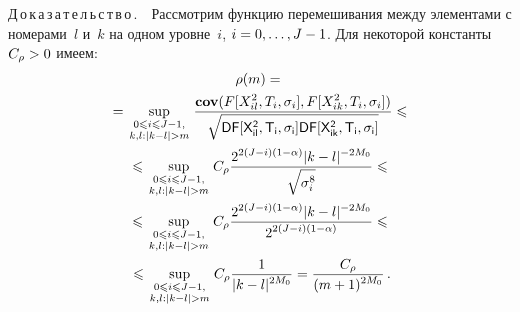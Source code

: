 \begin{multicols}{2}
\noindent
Д\,о\,к\,а\,з\,а\,т\,е\,л\,ь\,с\,т\,в\,о\,.\ \ 
Рассмотрим функцию перемешивания между элементами с номерами~$l$ и~$k$ на одном уровне~$i$, 
$i \hm=0, \dots, J-1$. Для некоторой константы $C_\rho\hm>0$ имеем:
\begin{multline}
\rho(m)={}\\
{}=
\sup\limits_{{\begin{smallmatrix}0\leqslant i\leqslant J-1,\\k,l:|k-l|>m\end{smallmatrix}}} 
\fr{\cov(F[X_{il}^2,T_i,\sigma_i],F[X_{ik}^2,T_i,\sigma_i])}
{\sqrt{\Variance F[X_{il}^2,T_i,\sigma_i] \Variance F[X_{ik}^2,T_i,\sigma_i]}}
\leqslant{}\\
{}\leqslant \sup\limits_{{\begin{smallmatrix}0\leqslant i\leqslant J-1,\\k,l:|k-l|>m\end{smallmatrix}}} 
C_\rho\fr{2^{2(J-i)(1-\alpha)} |k-l|^{-2M_0}}{\sqrt{\sigma^8_i}}\leqslant{}\\
{} \leqslant 
\sup_{{\begin{smallmatrix}0\leqslant i\leqslant J-1,\\k,l:|k-l|>m\end{smallmatrix}}}  
C_\rho\fr{2^{2(J-i)(1-\alpha)} |k-l|^{-2M_0}}{2^{2(J-i)(1-\alpha)} }
\leqslant{}\\
{}\leqslant \sup\limits_{{\begin{smallmatrix}0\leqslant 
i\leqslant J-1,\\k,l:|k-l|>m\end{smallmatrix}}}  C_\rho\fr{1}{|k-l|^{2M_0}} = 
\fr{C_\rho}{(m+1)^{2M_0}}\,.\notag
\end{multline}


\end{multicols}
